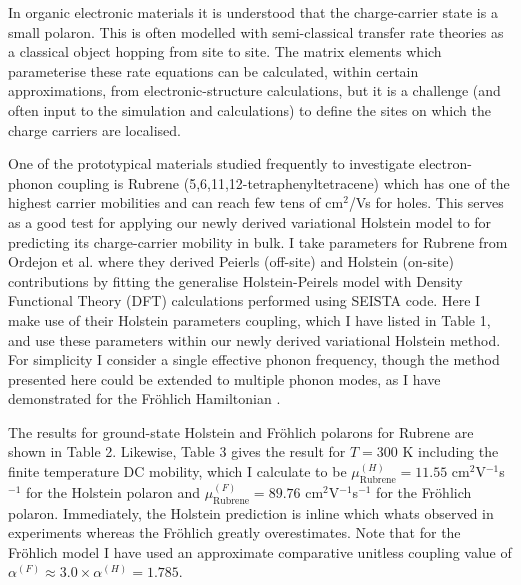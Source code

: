 \begin{figure}[!tbp]
  \label{fig:rubrene}
\end{figure}

In organic electronic materials it is understood that the charge-carrier state is a small polaron.  This is often modelled with semi-classical transfer rate theories as a classical object hopping from site to site. The matrix elements which parameterise these rate equations can be calculated, within certain approximations, from electronic-structure calculations, but it is a challenge (and often input to the simulation and calculations) to define the sites on which the charge carriers are localised. 
\newline

One of the prototypical materials studied frequently to investigate electron-phonon coupling is Rubrene (5,6,11,12-tetraphenyltetracene) which has one of the highest carrier mobilities and can reach few tens of cm$^2$/Vs for holes. This serves as a good test for applying our newly derived variational Holstein model to for predicting its charge-carrier mobility in bulk. I take parameters for Rubrene from Ordejon et al. \cite{Ordejn2017} where they derived Peierls (off-site) and Holstein (on-site) contributions by fitting the generalise Holstein-Peirels model with Density Functional Theory (DFT) calculations performed using SEISTA code. Here I make use of their Holstein parameters coupling, which I have listed in Table 1, and use these parameters within our newly derived variational Holstein method. For simplicity I consider a single effective phonon frequency, though the method presented here could be extended to multiple phonon modes, as I have demonstrated for the Fr\"ohlich Hamiltonian \cite{Martin2022}.
\newline

The results for ground-state Holstein and Fr\"ohlich polarons for Rubrene are shown in Table 2. Likewise, Table 3 gives the result for $T = 300$ K including the finite temperature DC mobility, which I calculate to be $\mu^{(H)}_{\text{Rubrene}} = 11.55$ cm$^2$V$^{-1}$s$^{-1}$ for the Holstein polaron and $\mu^{(F)}_{\text{Rubrene}} = 89.76$ cm$^2$V$^{-1}$s$^{-1}$ for the Fr\"ohlich polaron. Immediately, the Holstein prediction is inline which whats observed in experiments whereas the Fr\"ohlich greatly overestimates. Note that for the Fr\"ohlich model I have used an approximate comparative unitless coupling value of $\alpha^{(F)} \approx 3.0 \times \alpha^{(H)} = 1.785$.
\newline

